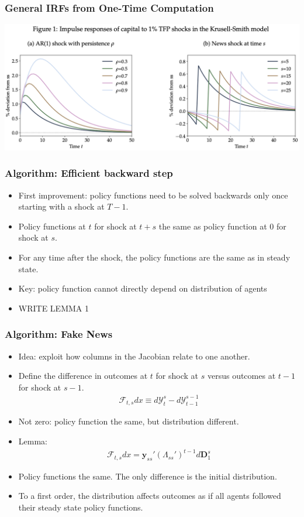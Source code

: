\documentclass[english,xcolor=svgnames]{beamer}
\begin{document}
\begin{frame}
    \frametitle{General IRFs from One-Time Computation}
    \includegraphics[scale=0.5]{figures/ABRSFIG1.png}
\end{frame}

\begin{frame}
    \frametitle{Algorithm: Efficient backward step}
    \begin{itemize}
        \item First improvement: policy functions need to be solved backwards only once starting with a shock at $T-1$.
        \item Policy functions at $t$ for shock at $t+s$ the same as policy function at $0$ for shock at $s$. 
        \item For any time after the shock, the policy functions are the same as in steady state.
        \item Key: policy function cannot directly depend on distribution of agents
        \item WRITE LEMMA 1
      \end{itemize}
\end{frame}

\begin{frame}
    \frametitle{Algorithm: Fake News}
    \begin{itemize}
    	\item Idea: exploit how columns in the Jacobian relate to one another.
        \item Define the difference in outcomes at $t$ for shock at $s$ versus outcomes at $t-1$ for shock at $s-1$.
        \begin{align*}
        	\mathcal{F}_{t,s}dx \equiv d\mathcal{Y}_{t}^{s} - d\mathcal{Y}_{t-1}^{s-1}
        \end{align*}
        \item Not zero: policy function the same, but distribution different.
        \item Lemma:
        \begin{align*}
        	\mathcal{F}_{t,s}dx = \bm{y}_{ss}' (\Lambda_{ss}')^{t-1}d\bm{D}_1^s
        \end{align*}
        \item Policy functions the same. The only difference is the initial distribution.
        \item To a first order, the distribution affects outcomes as if all agents followed their steady state policy functions.
	\end{itemize}
\end{frame}
\end{document}
